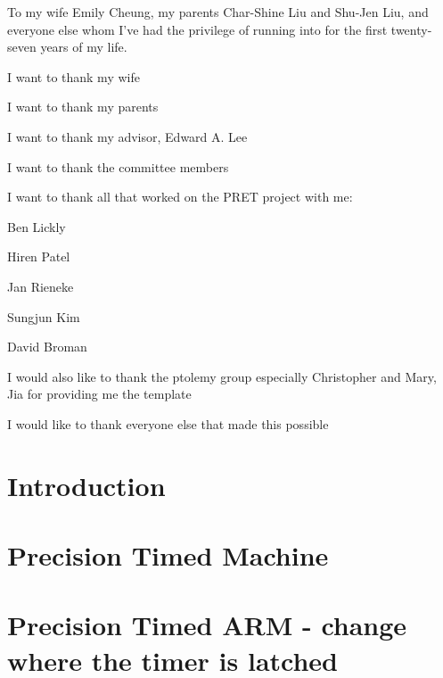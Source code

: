 \documentclass[11pt]{ucthesis}
\begin{document}
\begin{frontmatter}

\begin{dedication}
\null\vfil
{\large
\begin{center}
To my wife Emily Cheung, my parents Char-Shine Liu and Shu-Jen Liu, and everyone else whom
I've had the privilege of running into for the first twenty-seven years of my
life.
\end{center}}
\vfil\null
\end{dedication}

\tableofcontents
\listoffigures
\listoftables
\begin{acknowledgements}

I want to thank my wife

I want to thank my parents

I want to thank my advisor, Edward A. Lee

I want to thank the committee members

I want to thank all that worked on the PRET project with me: 

Ben Lickly

Hiren Patel

Jan Rieneke

Sungjun Kim

David Broman

I would also like to thank the ptolemy group especially Christopher and Mary, Jia for providing me the template

I would like to thank everyone else that made this possible

\end{acknowledgements}

\end{frontmatter}

\chapter{Introduction}
\label{chapter:intro}


\chapter{Precision Timed Machine}
\label{chapter:pret}


\chapter{Precision Timed ARM - change where the timer is latched}
\label{chapter:ptarm}

\end{document}
